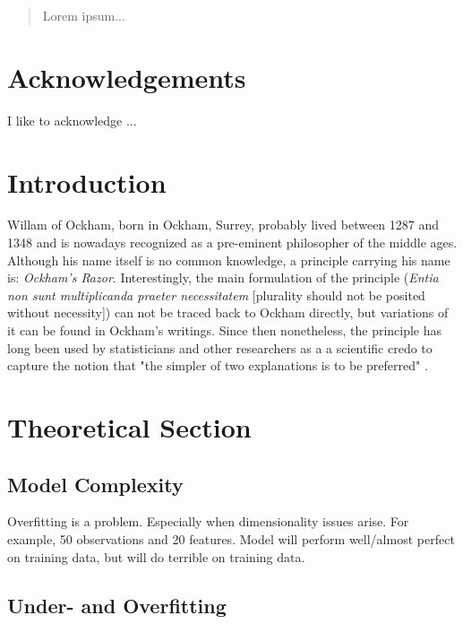 \documentclass[12pt,a4paper]{article}
\begin{document}
\begin{abstract}
Lorem ipsum...
\end{abstract}

\clearpage

\section*{Acknowledgements}
\thispagestyle{empty}

I like to acknowledge ...

\clearpage

\thispagestyle{plain}
\tableofcontents
\pagebreak
{}

\pagebreak
\section{Introduction}
Willam of Ockham, born in Ockham, Surrey, probably lived between 1287 and 1348 and is nowadays recognized as a pre-eminent philosopher of the middle ages. Although     his name itself is no common knowledge, a principle carrying his name is: \textit{Ockham's Razor}. Interestingly, the main formulation of the principle (\textit{Entia non sunt multiplicanda praeter necessitatem} [plurality should not be posited without necessity]) can not be traced back to Ockham directly, but variations of it can be found in Ockham's writings. Since then nonetheless, the principle has long been used by statisticians and other researchers as a a scientific credo to capture the notion that "the simpler of two explanations is to be preferred" \parencite{Lazar2010}.  

\newpage
\section{Theoretical Section}\label{sec:theorysuper}
\subsection{Model Complexity}
Overfitting is a problem. Especially when dimensionality issues arise. For example, 50 observations and 20 features. Model will perform well/almost perfect on training data, but will do terrible on training data.\\
\subsection{Under- and Overfitting}
\end{document}
